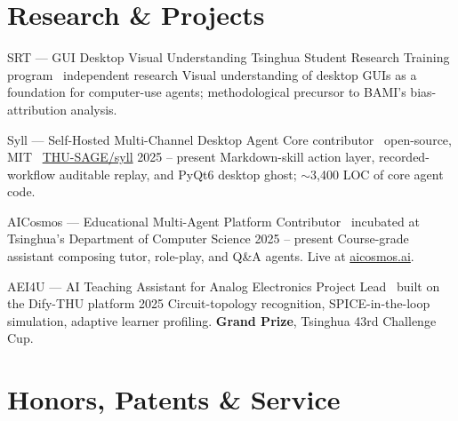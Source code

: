 \documentclass[10pt]{article}
\begin{document}
\section{Research \& Projects}


\cventry%
  {SRT --- GUI Desktop Visual Understanding}%
  {Tsinghua Student Research Training program \cvsep\ independent research}%
  {}%
  {Visual understanding of desktop GUIs as a foundation for computer-use agents; methodological precursor to BAMI's bias-attribution analysis.}

\cventry%
  {Syll --- Self-Hosted Multi-Channel Desktop Agent}%
  {Core contributor \cvsep\ open-source, MIT \cvsep\ \href{https://github.com/THU-SAGE/syll}{THU-SAGE/syll}}%
  {2025 -- present}%
  {Markdown-skill action layer, recorded-workflow auditable replay, and PyQt6 desktop ghost; $\sim$3{,}400 LOC of core agent code.}


\cventry%
  {AICosmos --- Educational Multi-Agent Platform}%
  {Contributor \cvsep\ incubated at Tsinghua's Department of Computer Science}%
  {2025 -- present}%
  {Course-grade assistant composing tutor, role-play, and Q\&A agents. Live at \href{https://aicosmos.ai}{aicosmos.ai}.}

\cventry%
  {AEI4U --- AI Teaching Assistant for Analog Electronics}%
  {Project Lead \cvsep\ built on the Dify-THU platform}%
  {2025}%
  {Circuit-topology recognition, SPICE-in-the-loop simulation, adaptive learner profiling. \textbf{Grand Prize}, Tsinghua 43rd Challenge Cup.}

\section{Honors, Patents \& Service}

\end{document}
